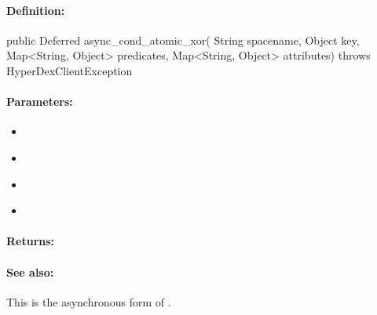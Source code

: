 \paragraph{Definition:}
\begin{javacode}
public Deferred async_cond_atomic_xor(
        String spacename,
        Object key,
        Map<String, Object> predicates,
        Map<String, Object> attributes) throws HyperDexClientException
\end{javacode}

\paragraph{Parameters:}
\begin{itemize}[noitemsep]
\item {}\\

\item {}\\

\item {}\\

\item {}\\

\end{itemize}

\paragraph{Returns:}


\paragraph{See also:}  This is the asynchronous form of .

\pagebreak
\subsubsection{}
\label{api:java:group_atomic_min}


